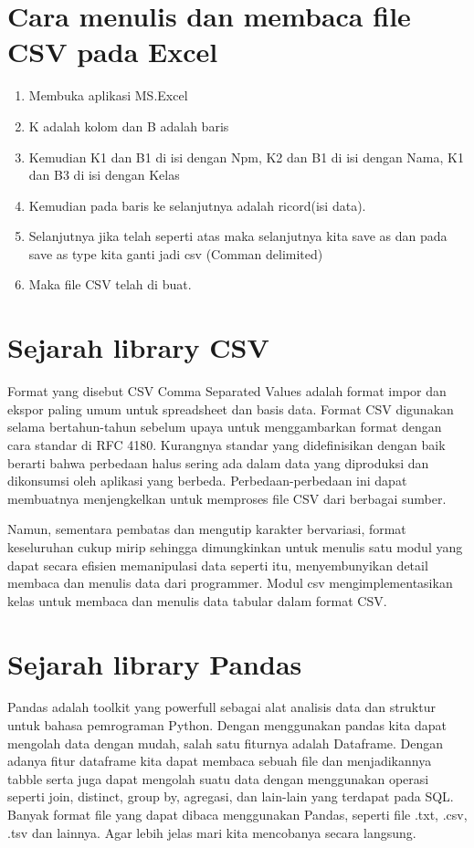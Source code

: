 \documentclass[12pt, times new roman]{report}
\begin{document}
\section{ Cara menulis dan membaca file CSV pada Excel}
\begin{enumerate}
\item Membuka aplikasi MS.Excel
\item K adalah kolom dan B adalah baris
\item Kemudian K1 dan B1 di isi dengan Npm, K2 dan B1 di isi dengan Nama,
K1 dan B3 di isi dengan Kelas
\item Kemudian pada baris ke selanjutnya adalah ricord(isi data).

\item Selanjutnya jika telah seperti atas maka selanjutnya kita save as dan pada
save as type kita ganti jadi csv (Comman delimited)

\item Maka file CSV telah di buat.
\end{enumerate}

\section{Sejarah library CSV}
\hspace{1cm} Format yang disebut CSV Comma Separated Values adalah format impor dan ekspor paling umum untuk spreadsheet dan basis data. Format CSV digunakan selama bertahun-tahun sebelum upaya untuk menggambarkan format
dengan cara standar di RFC 4180. Kurangnya standar yang didefinisikan dengan baik berarti bahwa perbedaan halus sering ada dalam data yang diproduksi
dan dikonsumsi oleh aplikasi yang berbeda. Perbedaan-perbedaan ini dapat
membuatnya menjengkelkan untuk memproses file CSV dari berbagai sumber.\\
\par Namun, sementara pembatas dan mengutip karakter bervariasi, format keseluruhan cukup mirip sehingga dimungkinkan untuk menulis satu modul yang dapat secara efisien memanipulasi data seperti itu, menyembunyikan detail
membaca dan menulis data dari programmer. Modul csv mengimplementasikan
kelas untuk membaca dan menulis data tabular dalam format CSV.

\section{Sejarah library Pandas}
\hspace{1cm} Pandas adalah toolkit yang powerfull sebagai alat analisis data dan struktur
untuk bahasa pemrograman Python. Dengan menggunakan pandas kita dapat
mengolah data dengan mudah, salah satu fiturnya adalah Dataframe. Dengan
adanya fitur dataframe kita dapat membaca sebuah file dan menjadikannya tabble serta juga dapat mengolah suatu data dengan menggunakan operasi seperti
join, distinct, group by, agregasi, dan lain-lain yang terdapat pada SQL. Banyak
format file yang dapat dibaca menggunakan Pandas, seperti file .txt, .csv, .tsv
dan lainnya. Agar lebih jelas mari kita mencobanya secara langsung.
\end{document}
